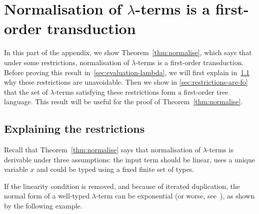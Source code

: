 \section{Normalisation of $\lambda$-terms is a first-order transduction}
\label{sec:eval}

\newcommand{\lambdaterm}{$\lambda$-term }
\newcommand{\lambdaterms}{$\lambda$-terms }

\newcommand{\NonLinTerms}[2]{\Lambda_{#1} #2}
\newcommand{\LinTerms}[2]{\mathsf{Lin}_{#1} #2}

 \newcommand{\rlambda}{\ranked{\Lambda}}
 \newcommand{\rlambdalin}{\ranked{\Lambda^{\sf{lin}}}}
 \newcommand{\rlambdathin}{\ranked{\Lambda^{\sf{thin}}}}


\newcommand{\thinterm}[1]{\ranked{\mathsf{Thin}_{#1}}}

In this part of the appendix, we show Theorem~\ref{thm:normalise}, which says that under some restrictions, normalisation of $\lambda$-terms is a first-order transduction. Before proving this result in~\ref{sec:evaluation-lambda}, we will first explain in~\ref{sec:explaining-restrictions} why these restrictions are unavoidable. Then we show in \ref{sec:restrictions-are-fo} that the set of $\lambda$-terms satisfying these restrictions form a first-order tree language. This result will be useful for the proof of Theorem~\ref{thm:normalise}.



\subsection{Explaining the restrictions}\label{sec:explaining-restrictions}

Recall that Theorem~\ref{thm:normalise} says that normalisation of $\lambda$-terms is derivable under three assumptions:
the input term should be linear, uses a unique variable $x$ and could be typed using a fixed finite set of types. 

If the linearity condition is removed, and because of iterated duplication, the normal form of a well-typed $\lambda$-term can be exponential (or worse, see~\cite[Section 3.6]{sorensen_lectures_2006}), as shown by the following example.
 
